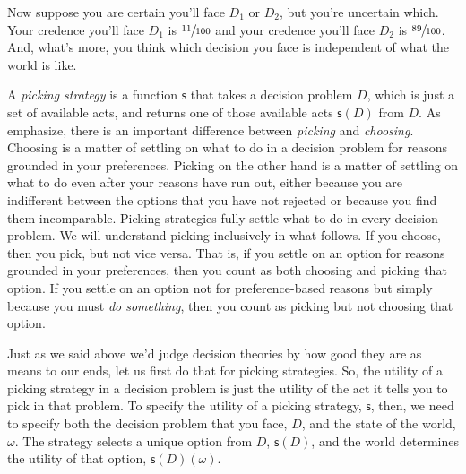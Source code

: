 \documentclass[a4paper]{article}
\newcommand\s{\mathsf{s}}
\newenvironment{CCM rewritten}
{\begingroup\color{blue}} %
{\endgroup}              %
\begin{document}
Now suppose you are certain you'll face $D_1$ or $D_2$, but you're uncertain which. Your credence you'll face $D_1$ is $\sfrac{11}{100}$ and your credence you'll face $D_2$ is $\sfrac{89}{100}$. And, what's more, you think which decision you face is independent of what the world is like.

A \textit{picking strategy} is a function $\s$ that takes a decision problem $D$, which is just a set of available acts, and returns one of those available acts $\s(D)$ from $D$. As \cite{ullman1977} emphasize, there is an important difference between \textit{picking} and \textit{choosing}. Choosing is a matter of settling on what to do in a decision problem for reasons grounded in your preferences. Picking on the other hand is a matter of settling on what to do even after your reasons have run out, either because you are indifferent between the options that you have not rejected or because you find them incomparable. Picking strategies fully settle what to do in every decision problem. We will understand picking inclusively in what follows. If you choose, then you pick, but not vice versa. That is, if you settle on an option for reasons grounded in your preferences, then you count as both choosing and picking that option. If you settle on an option not for preference-based reasons but simply because you must \textit{do something}, then you count as picking but not choosing that option.


Just as we said above we'd judge decision theories by how good they are as means to our ends, let us first do that for picking strategies. So, the utility of a picking strategy in a decision problem is just the utility of the act it tells you to pick in that problem. %
To specify the utility of a picking strategy, $\s$, then, we need to specify both the decision problem that you face, $D$, and the state of the world, $\omega$. The strategy selects a unique option from $D$, $\s(D)$, and the world determines the utility of that option, $\s(D)(\omega)$. 
\end{document}
